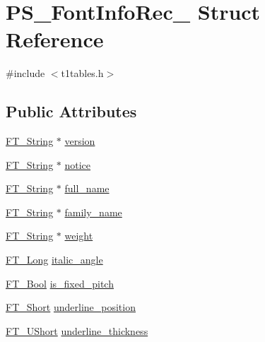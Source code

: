 \hypertarget{struct_p_s___font_info_rec__}{}\section{P\+S\+\_\+\+Font\+Info\+Rec\+\_\+ Struct Reference}
\label{struct_p_s___font_info_rec__}


{\ttfamily \#include $<$t1tables.\+h$>$}

\subsection*{Public Attributes}
\begin{DoxyCompactItemize}
\item 
\mbox{\hyperlink{fttypes_8h_a9846214585359eb2ba6bbb0e6de30639}{F\+T\+\_\+\+String}} $\ast$ \mbox{\hyperlink{struct_p_s___font_info_rec___adb595076e50f8e7ece9446f612433cfc}{version}}
\item 
\mbox{\hyperlink{fttypes_8h_a9846214585359eb2ba6bbb0e6de30639}{F\+T\+\_\+\+String}} $\ast$ \mbox{\hyperlink{struct_p_s___font_info_rec___a63858ebce653f21d9aa2ddc61ee32b80}{notice}}
\item 
\mbox{\hyperlink{fttypes_8h_a9846214585359eb2ba6bbb0e6de30639}{F\+T\+\_\+\+String}} $\ast$ \mbox{\hyperlink{struct_p_s___font_info_rec___a039dbf76ccc1b63b03e77215cb4b430b}{full\+\_\+name}}
\item 
\mbox{\hyperlink{fttypes_8h_a9846214585359eb2ba6bbb0e6de30639}{F\+T\+\_\+\+String}} $\ast$ \mbox{\hyperlink{struct_p_s___font_info_rec___ac54d883f153a495f9a20dc043ed434cf}{family\+\_\+name}}
\item 
\mbox{\hyperlink{fttypes_8h_a9846214585359eb2ba6bbb0e6de30639}{F\+T\+\_\+\+String}} $\ast$ \mbox{\hyperlink{struct_p_s___font_info_rec___a057243ec7cf62f573fa675ccb728f4b1}{weight}}
\item 
\mbox{\hyperlink{fttypes_8h_a7fa72a1f0e79fb1860c5965789024d6f}{F\+T\+\_\+\+Long}} \mbox{\hyperlink{struct_p_s___font_info_rec___ab558a75a56fadd54dfc71dcbeec1375a}{italic\+\_\+angle}}
\item 
\mbox{\hyperlink{fttypes_8h_a1a832a256bb5a7e6e884afaa1a07f3ae}{F\+T\+\_\+\+Bool}} \mbox{\hyperlink{struct_p_s___font_info_rec___a68e2d0913fe910ea86d558a4a426412a}{is\+\_\+fixed\+\_\+pitch}}
\item 
\mbox{\hyperlink{fttypes_8h_aa7279be89046a2563cd3d4d6651fbdcf}{F\+T\+\_\+\+Short}} \mbox{\hyperlink{struct_p_s___font_info_rec___a772af52d17288d7846e8893e74d55212}{underline\+\_\+position}}
\item 
\mbox{\hyperlink{fttypes_8h_a937f6c17cf5ffd09086d8610c37b9f58}{F\+T\+\_\+\+U\+Short}} \mbox{\hyperlink{struct_p_s___font_info_rec___a423904e811db5195485557bf0dccf126}{underline\+\_\+thickness}}
\end{DoxyCompactItemize}



